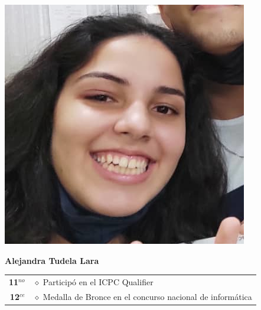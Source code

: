 \begin{minipage}{0.2\textwidth}
	\includegraphics[width=\linewidth]{img/concursantes/alejandra.png} %
\end{minipage}
\hfill
\begin{minipage}{0.7\textwidth}
	\textbf{Alejandra Tudela Lara}
	
	\vspace*{0.1in}
	\begin{tabular}{rl}
		
		
		\textbf{11$^{no}$} & $\diamond$ Participó en el ICPC Qualifier \\
		
		\textbf{12$^{ce}$} &  $\diamond$ Medalla de Bronce en el concurso nacional de informática \\
		
		
	\end{tabular}
\end{minipage}

\vspace*{0.2in}

